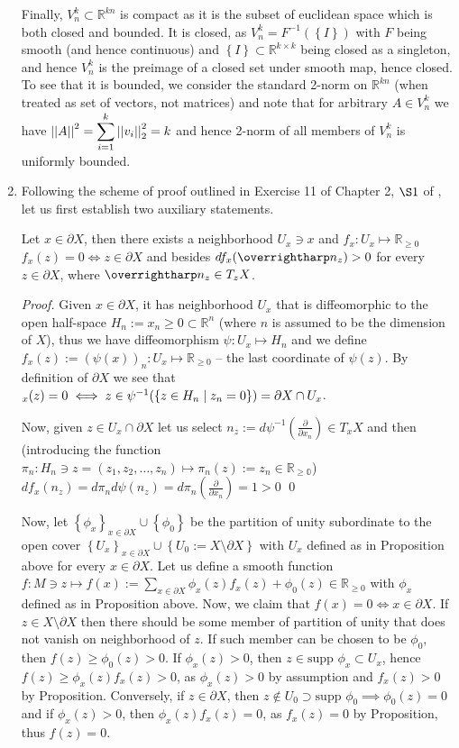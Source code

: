 \documentclass[8pt]{article} %
\begin{document}
\begin{enumerate}[label=\bfseries \arabic*.]
{		Finally, $V_n^k\subset\mathbb{R}^{kn}$ is compact as it is the subset of euclidean space which is both closed and bounded. It is closed, as
		$V_n^k=F^{-1}(\left\{I\right\})$ with $F$ being smooth (and hence continuous) and $\left\{I\right\}\subset\mathbb{R}^{k\times k}$ being closed
		as a singleton, and hence $V_n^k$ is the preimage of a closed set under smooth map, hence closed. To see that it is bounded, we consider the standard
		2-norm on $\mathbb{R}^{kn}$ (when treated as set of vectors, not matrices)
		and note that for arbitrary $A\in V_n^k$ we have $\mynorm{A}^2=\sum_{i=1}^k\mynorm{v_i}_2^2=k$ and hence 2-norm of all members of $V_n^k$ is uniformly
		bounded.
		}
		\item{Following the scheme of proof outlined in Exercise 11 of Chapter 2, $\S1$ of \cite{gp}, let us first establish two auxiliary statements.
			\begin{proposition}Let $x\in\partial X$, then there exists a neighborhood $U_x\ni x$
				and $f_x:U_x\mapsto\mathbb{R}_{\geq 0}$ 
				$f_x(z)=0\iff z\in\partial X$ and besides $df_x(\myvec{n_z})>0$
				for every $z\in\partial X$, where $\myvec{n_z}\in T_z X$.
		\end{proposition}
		\begin{proof}
			Given $x\in\partial X$, it has neighborhood $U_x$ that is diffeomorphic to the open half-space
			$H_n:={x_n\geq 0}\subset\mathbb{R}^n$ (where $n$ is assumed to be the dimension of $X$), thus we have
			diffeomorphism $\psi: U_x\mapsto H_n$ and we define $f_x(z):=\left(\psi(x)\right)_n:
			U_x\mapsto\mathbb{R}_{\geq 0}$ -- the last coordinate
			of $\psi(z)$. By definition of $\partial X$ we see that $_x(z)=0\iff z\in\psi^{-1}(\left\{z\in H_n\mid z_n=0\right\})=\partial X\cap U_x$.

			Now, given $z\in U_x\cap\partial X$
			let us select $n_z:=d\psi^{-1}(\frac{\partial}{\partial x_n})\in T_x X$ and then (introducing the function
			$\pi_n:H_n\ni z=(z_1,z_2,\dots,z_n)\mapsto \pi_n(z):=z_n\in\mathbb{R_{\geq 0}}$)
			$df_x(n_z)=d\pi_n d\psi (n_z)=d\pi_n(\frac{\partial}{\partial x_n})=1>0$ 
		\qed\end{proof}
		Now, let $\left\{\phi_x\right\}_{x\in\partial X}\cup\left\{\phi_0\right\}$ be the partition of unity subordinate
		to the open cover $\left\{U_x\right\}_{x\in\partial X}\cup\left\{U_0:=X\setminus\partial X\right\}$ with
		$U_x$ defined as in Proposition above for every $x\in\partial X$. Let us define a smooth function $f:M\ni z\mapsto
		f(x):=\sum_{x\in\partial X}\phi_x(z) f_x(z)+\phi_0(z)\in\mathbb{R}_{\geq 0}$
		with $\phi_x$ defined as in Proposition above. Now, we claim that $f(x)=0\iff
		x\in\partial X$. If $z\in X\setminus\partial X$
		then there should be some member of partition of unity that does not vanish on neighborhood of $z$. If such
		member can be chosen to be $\phi_0$, then $f(z)\geq \phi_0(z)>0$. If $\phi_x(z)>0$, then
		$z\in\mbox{supp }\phi_x\subset U_x$, hence $f(z)\geq \phi_x(z) f_x(z)>0$, as $\phi_x(z)>0$ by assumption
		and $f_x(z)>0$ by Proposition. Conversely, if $z\in\partial X$, then $z\notin U_0\supset
		\mbox{supp }\phi_0\implies \phi_0(z)=0$ and if $\phi_x(z)>0$, then $\phi_x(z)f_x(z)=0$, as $f_x(z)=0$ by Proposition,
		thus $f(z)=0$.

}
\end{enumerate}
\end{document}
